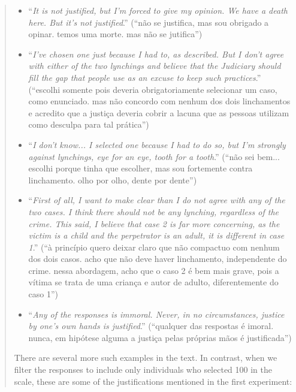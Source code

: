 \documentclass[a4paper,12pt]{article}
\begin{document}
\begin{quote}
\begin{itemize}
  \item ``\textit{It is not justified, but I'm forced to give my opinion. We have a death here. But it's not justified}.'' (``não se justifica, mas sou obrigado a opinar. temos uma morte. mas não se jutifica'') 
  \item ``\textit{I've chosen one just because I had to, as described. But I don't agree with either of the two lynchings and believe that the Judiciary should fill the gap that people use as an excuse to keep such practices}.'' (``escolhi somente pois deveria obrigatoriamente selecionar um caso, como enunciado. mas não concordo com nenhum dos dois linchamentos e acredito que a justiça deveria cobrir a lacuna que as pessoas utilizam como desculpa para tal prática'')
  \item ``\textit{I don't know... I selected one because I had to do so, but I'm strongly against lynchings, eye for an eye, tooth for a tooth}.'' (``não sei bem... escolhi porque tinha que escolher, mas sou fortemente contra linchamento. olho por olho, dente por dente'')
  \item ``\textit{First of all, I want to make clear than I do not agree with any of the two cases. I think there should not be any lynching, regardless of the crime. This said, I believe that case 2 is far more concerning, as the victim is a child and the perpetrator is an adult, it is different in case 1}.'' (``à princípio quero deixar claro que não compactuo com nenhum dos dois casos. acho que não deve haver linchamento, independente do crime. nessa abordagem, acho que o caso 2 é bem mais grave, pois a vítima se trata de uma criança e autor de adulto, diferentemente do caso 1'')
  \item ``\textit{Any of the responses is immoral. Never, in no circumstances, justice by one's own hands is justified}.'' (``qualquer das respostas é imoral. nunca, em hipótese alguma a justiça pelas próprias mãos é justificada'')

\end{itemize}

There are several more such examples in the text. In contrast, when we filter
the responses to include only individuals who selected 100 in the scale, these
are some of the justifications mentioned in the first experiment:


\end{quote}
\end{document}
